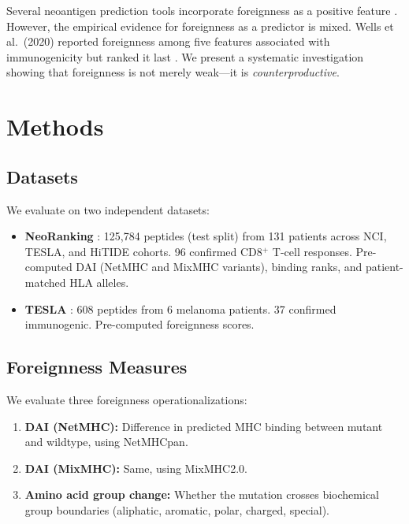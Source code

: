 \documentclass[11pt,twocolumn]{article}
\begin{document}
Several neoantigen prediction tools incorporate foreignness as a positive feature \cite{muller2023neoranking, li2021deepimmuno}. However, the empirical evidence for foreignness as a predictor is mixed. Wells et al.\ (2020) reported foreignness among five features associated with immunogenicity but ranked it last \cite{wells2020tesla}. We present a systematic investigation showing that foreignness is not merely weak---it is \textit{counterproductive}.

\section{Methods}

\subsection{Datasets}

We evaluate on two independent datasets:

\begin{itemize}[leftmargin=*,topsep=0pt,itemsep=2pt]
\item \textbf{NeoRanking} \cite{muller2023neoranking}: 125,784 peptides (test split) from 131 patients across NCI, TESLA, and HiTIDE cohorts. 96 confirmed CD8$^{+}$ T-cell responses. Pre-computed DAI (NetMHC and MixMHC variants), binding ranks, and patient-matched HLA alleles.
\item \textbf{TESLA} \cite{wells2020tesla}: 608 peptides from 6 melanoma patients. 37 confirmed immunogenic. Pre-computed foreignness scores.
\end{itemize}

\subsection{Foreignness Measures}

We evaluate three foreignness operationalizations:

\begin{enumerate}[leftmargin=*,topsep=0pt,itemsep=0pt]
\item \textbf{DAI (NetMHC):} Difference in predicted MHC binding between mutant and wildtype, using NetMHCpan.
\item \textbf{DAI (MixMHC):} Same, using MixMHC2.0.
\item \textbf{Amino acid group change:} Whether the mutation crosses biochemical group boundaries (aliphatic, aromatic, polar, charged, special).
\end{enumerate}
\end{document}
